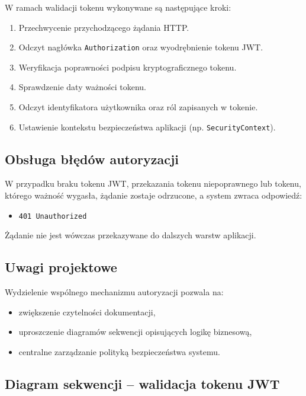 \documentclass[11pt, a4paper]{article}
\begin{document}
W ramach walidacji tokenu wykonywane są następujące kroki:

\begin{enumerate}
    \item Przechwycenie przychodzącego żądania HTTP.
    \item Odczyt nagłówka \texttt{Authorization} oraz wyodrębnienie tokenu JWT.
    \item Weryfikacja poprawności podpisu kryptograficznego tokenu.
    \item Sprawdzenie daty ważności tokenu.
    \item Odczyt identyfikatora użytkownika oraz ról zapisanych w tokenie.
    \item Ustawienie kontekstu bezpieczeństwa aplikacji (np. \texttt{SecurityContext}).
\end{enumerate}

\subsection{Obsługa błędów autoryzacji}

W przypadku braku tokenu JWT, przekazania tokenu niepoprawnego lub tokenu,
którego ważność wygasła, żądanie zostaje odrzucone, a system zwraca odpowiedź:

\begin{itemize}
    \item \texttt{401 Unauthorized}
\end{itemize}

Żądanie nie jest wówczas przekazywane do dalszych warstw aplikacji.

\subsection{Uwagi projektowe}

Wydzielenie wspólnego mechanizmu autoryzacji pozwala na:
\begin{itemize}
    \item zwiększenie czytelności dokumentacji,
    \item uproszczenie diagramów sekwencji opisujących logikę biznesową,
    \item centralne zarządzanie polityką bezpieczeństwa systemu.
\end{itemize}

\subsection{Diagram sekwencji – walidacja tokenu JWT}
\end{document}
